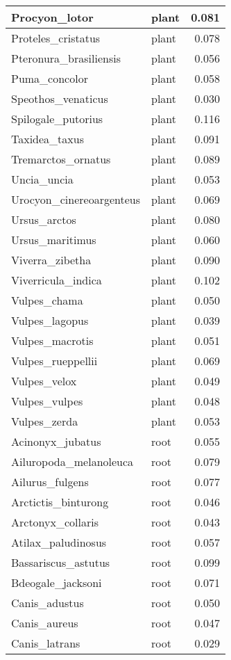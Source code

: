 \begin{table}
\begin{tabular}[t]{l|l|r}
Procyon\_lotor & plant & 0.081\\
\hline
Proteles\_cristatus & plant & 0.078\\
\hline
Pteronura\_brasiliensis & plant & 0.056\\
\hline
Puma\_concolor & plant & 0.058\\
\hline
Speothos\_venaticus & plant & 0.030\\
\hline
Spilogale\_putorius & plant & 0.116\\
\hline
Taxidea\_taxus & plant & 0.091\\
\hline
Tremarctos\_ornatus & plant & 0.089\\
\hline
Uncia\_uncia & plant & 0.053\\
\hline
Urocyon\_cinereoargenteus & plant & 0.069\\
\hline
Ursus\_arctos & plant & 0.080\\
\hline
Ursus\_maritimus & plant & 0.060\\
\hline
Viverra\_zibetha & plant & 0.090\\
\hline
Viverricula\_indica & plant & 0.102\\
\hline
Vulpes\_chama & plant & 0.050\\
\hline
Vulpes\_lagopus & plant & 0.039\\
\hline
Vulpes\_macrotis & plant & 0.051\\
\hline
Vulpes\_rueppellii & plant & 0.069\\
\hline
Vulpes\_velox & plant & 0.049\\
\hline
Vulpes\_vulpes & plant & 0.048\\
\hline
Vulpes\_zerda & plant & 0.053\\
\hline
Acinonyx\_jubatus & root & 0.055\\
\hline
Ailuropoda\_melanoleuca & root & 0.079\\
\hline
Ailurus\_fulgens & root & 0.077\\
\hline
Arctictis\_binturong & root & 0.046\\
\hline
Arctonyx\_collaris & root & 0.043\\
\hline
Atilax\_paludinosus & root & 0.057\\
\hline
Bassariscus\_astutus & root & 0.099\\
\hline
Bdeogale\_jacksoni & root & 0.071\\
\hline
Canis\_adustus & root & 0.050\\
\hline
Canis\_aureus & root & 0.047\\
\hline
Canis\_latrans & root & 0.029\\

\end{tabular}
\end{table}

